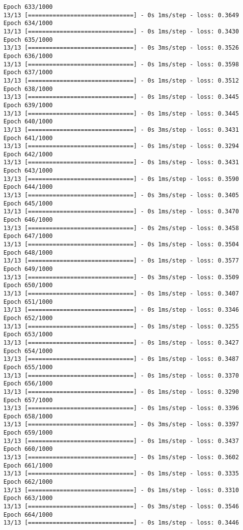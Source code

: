 \documentclass[11pt]{article}
\begin{document}
\begin{Verbatim}[commandchars=\\\{\}]
Epoch 633/1000
13/13 [==============================] - 0s 1ms/step - loss: 0.3649
Epoch 634/1000
13/13 [==============================] - 0s 1ms/step - loss: 0.3430
Epoch 635/1000
13/13 [==============================] - 0s 3ms/step - loss: 0.3526
Epoch 636/1000
13/13 [==============================] - 0s 1ms/step - loss: 0.3598
Epoch 637/1000
13/13 [==============================] - 0s 1ms/step - loss: 0.3512
Epoch 638/1000
13/13 [==============================] - 0s 1ms/step - loss: 0.3445
Epoch 639/1000
13/13 [==============================] - 0s 1ms/step - loss: 0.3445
Epoch 640/1000
13/13 [==============================] - 0s 3ms/step - loss: 0.3431
Epoch 641/1000
13/13 [==============================] - 0s 1ms/step - loss: 0.3294
Epoch 642/1000
13/13 [==============================] - 0s 1ms/step - loss: 0.3431
Epoch 643/1000
13/13 [==============================] - 0s 1ms/step - loss: 0.3590
Epoch 644/1000
13/13 [==============================] - 0s 3ms/step - loss: 0.3405
Epoch 645/1000
13/13 [==============================] - 0s 1ms/step - loss: 0.3470
Epoch 646/1000
13/13 [==============================] - 0s 2ms/step - loss: 0.3458
Epoch 647/1000
13/13 [==============================] - 0s 1ms/step - loss: 0.3504
Epoch 648/1000
13/13 [==============================] - 0s 1ms/step - loss: 0.3577
Epoch 649/1000
13/13 [==============================] - 0s 3ms/step - loss: 0.3509
Epoch 650/1000
13/13 [==============================] - 0s 1ms/step - loss: 0.3407
Epoch 651/1000
13/13 [==============================] - 0s 1ms/step - loss: 0.3346
Epoch 652/1000
13/13 [==============================] - 0s 1ms/step - loss: 0.3255
Epoch 653/1000
13/13 [==============================] - 0s 1ms/step - loss: 0.3427
Epoch 654/1000
13/13 [==============================] - 0s 1ms/step - loss: 0.3487
Epoch 655/1000
13/13 [==============================] - 0s 1ms/step - loss: 0.3370
Epoch 656/1000
13/13 [==============================] - 0s 1ms/step - loss: 0.3290
Epoch 657/1000
13/13 [==============================] - 0s 1ms/step - loss: 0.3396
Epoch 658/1000
13/13 [==============================] - 0s 3ms/step - loss: 0.3397
Epoch 659/1000
13/13 [==============================] - 0s 1ms/step - loss: 0.3437
Epoch 660/1000
13/13 [==============================] - 0s 1ms/step - loss: 0.3602
Epoch 661/1000
13/13 [==============================] - 0s 1ms/step - loss: 0.3335
Epoch 662/1000
13/13 [==============================] - 0s 1ms/step - loss: 0.3310
Epoch 663/1000
13/13 [==============================] - 0s 3ms/step - loss: 0.3546
Epoch 664/1000
13/13 [==============================] - 0s 1ms/step - loss: 0.3446

\end{Verbatim}
\end{document}
